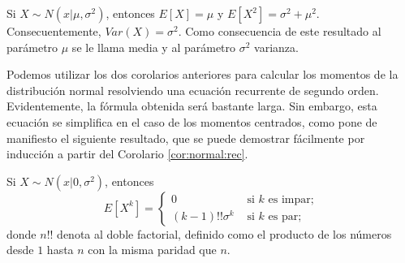 \documentclass{article}
\begin{document}
\begin{cor}
    Si $X \sim N(x|\mu,\sigma^2)$, entonces $E[X] = \mu$ y $E[X^2] = \sigma^2 + \mu^2$. Consecuentemente, $Var(X) = \sigma^2$. Como consecuencia de este resultado al parámetro $\mu$ se le llama media y al parámetro $\sigma^2$ varianza.
\end{cor}

Podemos utilizar los dos corolarios anteriores para calcular los momentos de la distribución normal resolviendo una ecuación recurrente de segundo orden. Evidentemente, la fórmula obtenida será bastante larga. Sin embargo, esta ecuación se simplifica en el caso de los momentos centrados, como pone de manifiesto el siguiente resultado, que se puede demostrar fácilmente por inducción a partir del Corolario \ref{cor:normal:rec}.

\begin{cor}
    Si $X \sim N(x|0,\sigma^2)$, entonces
    \[E[X^k] = \begin{cases} 0 & \text{ si } k \text{ es impar;} \\ (k-1)!! \sigma^{k} & \text{ si } k \text{ es par;} \end{cases}\]
    donde $n!!$ denota al doble factorial, definido como el producto de los números desde $1$ hasta $n$ con la misma paridad que $n$.
\end{cor}
\end{document}
